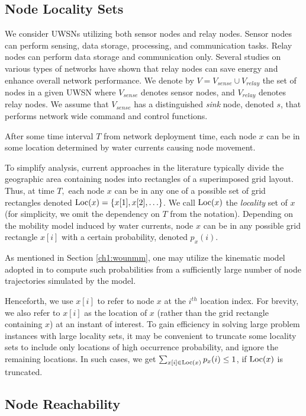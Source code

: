 \subsection{Node Locality Sets}
\label{ch1:nls}
We consider UWSNs utilizing both sensor nodes and relay nodes. Sensor nodes can perform sensing, data storage, processing, and communication tasks. Relay nodes can perform data storage and communication only. Several studies on various types of networks have shown that relay nodes can save energy and enhance overall network performance.
We denote by $V=V_{sense}\cup V_{relay}$ the set of nodes in a given UWSN where $V_{sense}$ denotes sensor nodes, and $V_{relay}$ denotes relay nodes.
%
We assume that $V_{sense}$ has a distinguished {\em sink} node,
denoted $s$, that performs network wide command and control functions.


After some time interval $T$ from network deployment time,
each node $x$ can be in some location determined by water currents
causing node movement.


To simplify analysis, current approaches in the literature typically divide
the geographic area containing nodes into rectangles of a superimposed
grid layout.
%
Thus, at time $T,$ each node $x$ can be in any one of a possible
set of grid rectangles denoted ${\mathrm {Loc}}(x)= \{ x[1], x[2], \ldots \}$.
%
We call ${\mathrm {Loc}}(x)$ the {\em locality} set of $x$ (for simplicity,
we omit the dependency on $T$ from the notation).
%
Depending on the mobility model induced by water currents, node $x$
can be in any possible grid rectangle $x[i]$ with a certain probability,
denoted $p_x(i)$. 
%

As mentioned in Section \ref{ch1:wounmm}, one may utilize the kinematic model adopted in \cite{caruso2008meandering} to compute such probabilities from a sufficiently large number of node trajectories simulated by the model.

Henceforth, we use $x[i]$ to refer to node $x$ at the $i^{th}$ location index.
%
For brevity, we also refer to $x[i]$ as the location of $x$
(rather than the grid rectangle containing $x$) at an instant of interest.
%
To gain efficiency in solving large problem instances with large locality
sets, it may be convenient to truncate some locality sets to include only
locations of high occurrence probability, and ignore the remaining locations.
%
In such cases, we get $\sum_{x[i] \in {\mathrm {Loc}}(x)} p_x(i) \leq 1$, if ${\mathrm {Loc}}(x)$
is truncated.


\subsection{Node Reachability}

